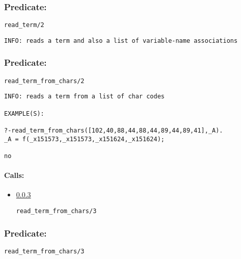 \subsubsection{Predicate:} \label{readV95WtermV95W2}

\begin{verbatim}
read_term/2
\end{verbatim}

{\small \begin{verbatim}
INFO: reads a term and also a list of variable-name associations

\end{verbatim}}

\subsubsection{Predicate:} \label{readV95WtermV95WfromV95WcharsV95W2}

\begin{verbatim}
read_term_from_chars/2
\end{verbatim}

{\small \begin{verbatim}
INFO: reads a term from a list of char codes

EXAMPLE(S):

?-read_term_from_chars([102,40,88,44,88,44,89,44,89,41],_A).
_A = f(_x151573,_x151573,_x151624,_x151624);

no

\end{verbatim}}
\paragraph{Calls:} 
\begin{itemize}
\item \ref{readV95WtermV95WfromV95WcharsV95W3} 
\begin{verbatim}
read_term_from_chars/3
\end{verbatim}

\end{itemize}

\subsubsection{Predicate:} \label{readV95WtermV95WfromV95WcharsV95W3}

\begin{verbatim}
read_term_from_chars/3
\end{verbatim}

